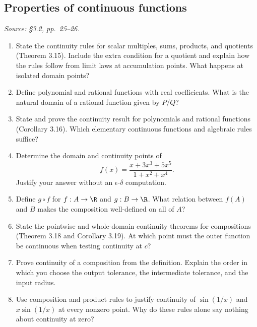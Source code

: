 \subsection{Properties of continuous functions}
\textit{Source: \S3.2, pp.~25--26.}

\begin{enumerate}[resume]
  \item State the continuity rules for scalar multiples, sums,
    products, and quotients (Theorem 3.15). Include the extra condition
    for a quotient and explain how the rules follow from limit laws
    at accumulation points. What happens at isolated domain points?

  \item Define polynomial and rational functions with real coefficients.
    What is the natural domain of a rational function given by \(P/Q\)?

  \item State and prove the continuity result for polynomials and
    rational functions (Corollary 3.16). Which elementary continuous
    functions and algebraic rules suffice?

  \item Determine the domain and continuity points of
    \[
      f(x)=\frac{x+3x^3+5x^5}{1+x^2+x^4}.
    \]
    Justify your answer without an \(\epsilon\)-\(\delta\) computation.

  \item Define \(g\circ f\) for \(f:A\to\R\) and \(g:B\to\R\).
    What relation between \(f(A)\) and \(B\) makes the composition
    well-defined on all of \(A\)?

  \item State the pointwise and whole-domain continuity theorems for
    compositions (Theorem 3.18 and Corollary 3.19). At which point
    must the outer function be continuous when testing continuity at \(c\)?

  \item Prove continuity of a composition from the definition.
    Explain the order in which you choose the output tolerance,
    the intermediate tolerance, and the input radius.

  \item Use composition and product rules to justify continuity of
    \(\sin(1/x)\) and \(x\sin(1/x)\) at every nonzero point.
    Why do these rules alone say nothing about continuity at zero?
\end{enumerate}

